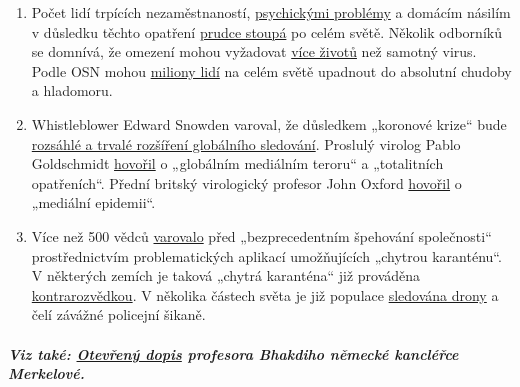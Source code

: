 \begin{enumerate}
{  prasečí chřipce} z roku 2009 ve skutečnosti někdy vedla k
  \href{https://www.ibtimes.co.uk/brain-damaged-uk-victims-swine-flu-vaccine-get-60-million-compensation-1438572}{závažným
  neurologickým poruchám} a soudním sporům o náhradu škody v~řádu
  milionů.
\item
  Počet lidí trpících nezaměstnaností,
  \href{https://www.indystar.com/story/news/health/2020/04/03/coronavirus-indiana-how-get-help-mental-health-addiction/5104357002/}{psychickými
  problémy} a domácím násilím v důsledku těchto opatření
  \href{https://www.reuters.com/article/us-health-coronavirus-usa-layoffs/us-weekly-jobless-claims-seen-at-record-high-again-idUSKBN21K0FX}{prudce
  stoupá} po celém světě. Několik odborníků se domnívá, že omezení mohou
  vyžadovat
  \href{https://www.nytimes.com/2020/03/20/opinion/coronavirus-pandemic-social-distancing.html}{více
  životů} než samotný virus. Podle OSN mohou
  \href{https://www.theguardian.com/global-development/2020/apr/21/coronavirus-pandemic-will-cause-famine-of-biblical-proportions}{miliony
  lidí} na celém světě upadnout do absolutní chudoby a hladomoru.
\item
  Whistleblower Edward Snowden varoval, že důsledkem „koronové krize``
  bude \href{https://www.youtube.com/watch?v=-pcQFTzck_c}{rozsáhlé a
  trvalé rozšíření globálního sledování}. Proslulý virolog Pablo
  Goldschmidt
  \href{https://www.rubikon.news/artikel/der-corona-totalitarismus}{hovořil}
  o „globálním mediálním teroru`` a „totalitních opatřeních``. Přední
  britský virologický profesor John Oxford
  \href{https://novuscomms.com/2020/03/31/a-view-from-the-hvivo-open-orphan-orph-laboratory-professor-john-oxford/}{hovořil}
  o „mediální epidemii``.
\item
  Více než 500 vědců
  \href{https://www.esat.kuleuven.be/cosic/sites/contact-tracing-joint-statement/}{varovalo}
  před „bezprecedentním špehování společnosti`` prostřednictvím
  problematických aplikací umožňujících „chytrou karanténu``. V
  některých zemích je taková „chytrá karanténa`` již prováděna
  \href{https://www.jewishpress.com/news/the-courts/state-to-high-court-even-more-shin-bet-involvement-in-fighting-the-coronavirus/2020/04/14/}{kontrarozvědkou}.
  V několika částech světa je již populace
  \href{https://off-guardian.org/2020/04/25/50-headlines-darker-more-of-the-new-normal/}{sledována
  drony} a čelí závážné policejní šikaně.
\end{enumerate}

\hypertarget{viz-takuxe9-otevux159enuxfd-dopis-profesora-bhakdiho-nux11bmeckuxe9-kancluxe9ux159ce-merkelovuxe9}{%
\subparagraph{\texorpdfstring{\textbf{Viz také}:
\href{https://swprs.org/open-letter-from-professor-sucharit-bhakdi-to-german-chancellor-dr-angela-merkel/}{Otevřený
dopis} profesora Bhakdiho německé kancléřce
Merkelové.}{Viz také: Otevřený dopis profesora Bhakdiho německé kancléřce Merkelové.}}\label{viz-takuxe9-otevux159enuxfd-dopis-profesora-bhakdiho-nux11bmeckuxe9-kancluxe9ux159ce-merkelovuxe9}}


